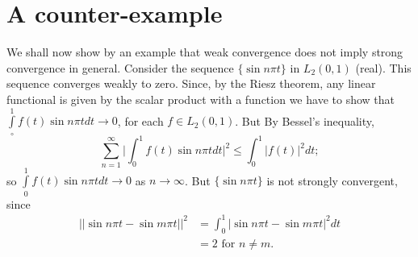 \section{A counter-example}\label{chap3:sec4}

We shall now show by an example that weak convergence does not imply
strong convergence in general. Consider the sequence $\{\sin n \pi t
\}$ in $L_2 (0, 1 )$ (real). This sequence converges weakly to
zero. Since, by the Riesz theorem, any linear functional is given by
the scalar product with a function we have to show that $\int\limits_\circ^1 f(t)
\sin n \pi t dt \to 0$, for each $f \in L_2 (0,1)$. But By Bessel's
inequality, 
$$
\sum_{n=1}^\infty \big| \int_0^1 f(t) \sin n \pi t dt\big|^2 \leq
\int^1_0 |f(t)|^2 dt; 
$$
so $\int\limits_0^1 f(t) \sin n \pi t dt \to 0$ as $n \to \infty$. But $\{
\sin n \pi t \} $ is not strongly convergent, since 
\begin{align*}
 || \sin n \pi t - \sin m \pi t ||^2 & = \int_0^1 | \sin n \pi t - \sin m
 \pi t |^2 dt \\ 
 & = 2 \text { for } n \neq m.  
\end{align*}
